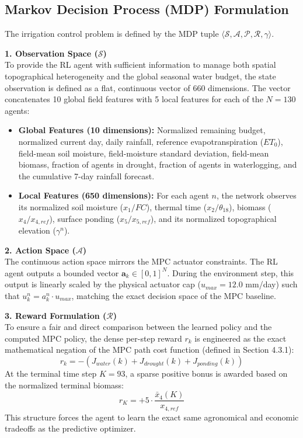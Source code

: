 \documentclass[11pt, a4paper]{article}
\begin{document}
\subsection{Markov Decision Process (MDP) Formulation}
The irrigation control problem is defined by the MDP tuple $\langle \mathcal{S}, \mathcal{A}, \mathcal{P}, \mathcal{R}, \gamma \rangle$. 

\textbf{1. Observation Space ($\mathcal{S}$)} \\
To provide the RL agent with sufficient information to manage both spatial topographical heterogeneity and the global seasonal water budget, the state observation is defined as a flat, continuous vector of 660 dimensions. The vector concatenates 10 global field features with 5 local features for each of the $N=130$ agents:
\begin{itemize}
    \item \textbf{Global Features (10 dimensions):} Normalized remaining budget, normalized current day, daily rainfall, reference evapotranspiration ($ET_0$), field-mean soil moisture, field-moisture standard deviation, field-mean biomass, fraction of agents in drought, fraction of agents in waterlogging, and the cumulative 7-day rainfall forecast. 
    \item \textbf{Local Features (650 dimensions):} For each agent $n$, the network observes its normalized soil moisture ($x_1/FC$), thermal time ($x_2/\theta_{18}$), biomass ($x_4/x_{4,ref}$), surface ponding ($x_5/x_{5,ref}$), and its normalized topographical elevation ($\gamma^n$).
\end{itemize}

\textbf{2. Action Space ($\mathcal{A}$)} \\
The continuous action space mirrors the MPC actuator constraints. The RL agent outputs a bounded vector $\mathbf{a}_k \in [0, 1]^N$. During the environment step, this output is linearly scaled by the physical actuator cap ($u_{max} = 12.0$ mm/day) such that $u^n_k = a^n_k \cdot u_{max}$, matching the exact decision space of the MPC baseline.

\textbf{3. Reward Formulation ($\mathcal{R}$)} \\
To ensure a fair and direct comparison between the learned policy and the computed MPC policy, the dense per-step reward $r_k$ is engineered as the exact mathematical negation of the MPC path cost function (defined in Section 4.3.1):
\begin{equation}
    r_k = -\left( J_{water}(k) + J_{drought}(k) + J_{ponding}(k) \right)
\end{equation}
At the terminal time step $K = 93$, a sparse positive bonus is awarded based on the normalized terminal biomass:
\begin{equation}
    r_K = +5 \cdot \frac{\bar{x}_4(K)}{x_{4,ref}}
\end{equation}
This structure forces the agent to learn the exact same agronomical and economic tradeoffs as the predictive optimizer.
\end{document}
